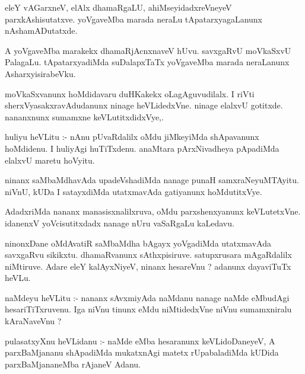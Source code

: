 \documentclass{article}
\begin{document}
\begin{mn}
eleY  vAGarxneV,  elAlx dhamaRgaLU,  ahiMseyidadxreVneyeV  parxkAshisutatxve.  
yoVgaveMba  marada  neraLu  tApatarxyagaLanunx  nAshamADutatxde.
\end{mn}

\begin{mn}
A yoVgaveMba  marakekx  dhamaRjAcnxnaveV  hUvu.  savxgaRvU  moVkaSxvU  PalagaLu.  
tApatarxyadiMda  suDalapxTaTx  yoVgaveMba  marada  neraLanunx  AsharxyisirabeVku.
\end{mn}

\begin{mn}
moVkaSxvanunx  hoMdidavaru  duHKakekx  oLagAguvudilalx.  I riVti  sherxVyasakxravAdudanunx  
ninage  heVLidedxVne.  ninage  elalxvU  gotitxde.  nananxnunx  sumamxne  keVLutitxdidxVye,.  
\end{mn}

\begin{mn}
huliyu  heVLitu :- nAnu  pUvaRdalilx  oMdu  jiMkeyiMda  shApavanunx  hoMdidenu.  
I  huliyAgi  huTiTxdenu.  anaMtara  pArxNivadheya  pApadiMda  elalxvU  maretu hoVyitu.
\end{mn}

\begin{mn}
ninanx  saMbaMdhavAda  upadeVshadiMda  nanage  punaH  samxraNeyuMTAyitu.  
niVnU,  kUDa  I  satayxdiMda  utatxmavAda  gatiyanunx  hoMdutitxVye. 
\end{mn}

\begin{mn}
AdadxriMda  nananx  manasisxnalilxruva,  oMdu  parxshenxyanunx  keVLutetxVne.  
idanenxV  yoVcisutitxdadx  nanage  nUru  vaSaRgaLu  kaLedavu. 
\end{mn}

\begin{mn}
ninonxDane  oMdAvatiR  saMbaMdha bAgayx yoVgadiMda  utatxmavAda  savxgaRvu 
sikikxtu.  dhamaRvanunx  sAthxpisiruve.  satupxrusara  mAgaRdalilx  niMtiruve.  
Adare  eleY  kalAyxNiyeV,  ninanx  hesareVnu ?  adanunx  dayaviTuTx  heVLu.  
\end{mn}

\begin{mn}
naMdeyu  heVLitu :- nananx  sAvxmiyAda  naMdanu  nanage  naMde  eMbudAgi  hesariTiTxruvenu.  
Iga  niVnu  tinunx  eMdu  niMtidedxVne  niVnu  sumamxniralu  kAraNaveVnu ? 
\end{mn}

\begin{mn}
pulasatxyXnu  heVLidanu :- naMde  eMba  hesaranunx  keVLidoDaneyeV,  A  parxBaMjananu  
shApadiMda  mukatxnAgi  matetx  rUpabaladiMda  kUDida  parxBaMjananeMba  rAjaneV  Adanu.  
\end{mn}
\end{document}

